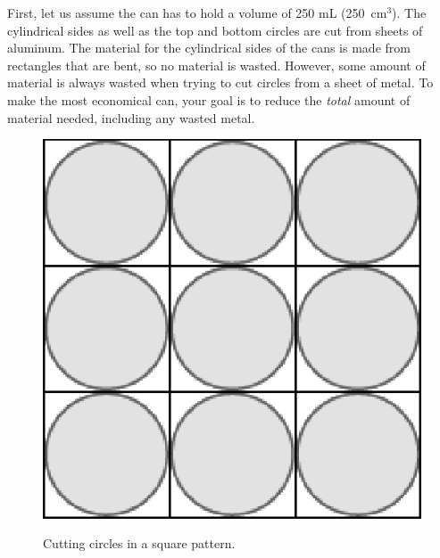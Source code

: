First, let us assume the can has to hold a volume of 250 mL (250~cm$^3$). The cylindrical sides as well as the top and bottom circles are cut from sheets of aluminum. The material for the cylindrical sides of the cans is made from rectangles that are bent, so no material is wasted. However, some amount of material is always wasted when trying to cut circles from a sheet of metal. To make the most economical can, your goal is to reduce the \textit{total} amount of material needed, including any wasted metal.
\begin{figure}[h]
\centering
\includegraphics[scale=0.5]{activities/math112/figures/squares.eps}
\label{fig:square}
\caption{Cutting circles in a square pattern.}
\end{figure}
